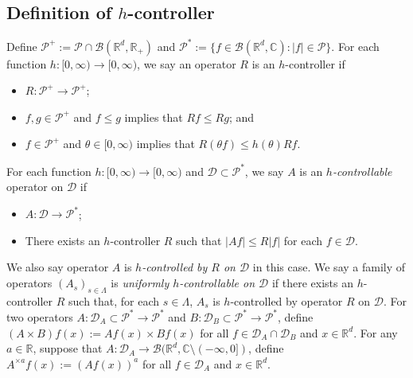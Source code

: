 \documentclass[12pt,a4paper]{amsart}
\theoremstyle{plain}
\theoremstyle{definition}
\numberwithin{equation}{section}
\begin{document}
\subsection{Definition of $h$-controller}
    Define $\mathcal P^+:= \mathcal P \cap \mathcal B(\mathbb R^d, \mathbb R_+)$ and $\mathcal P^*:= \{f\in \mathcal B(\mathbb R^d, \mathbb C): |f|\in \mathcal P\}$.
    For each function $h: [0,\infty) \to [0,\infty)$, we say an operator $R$ is an $h$-controller if
\begin{itemize}
\item
    $R: \mathcal P^+ \to \mathcal P^+$;
\item
    $f, g\in \mathcal P^+$ and $f\leq g$ implies that $Rf \leq Rg$; and
\item
    $f \in \mathcal P^+$ and $\theta \in [0,\infty)$ implies that $ R (\theta f)\leq h(\theta) Rf$.
\end{itemize}
    For each function $h: [0,\infty) \to [0,\infty)$ and $\mathcal D \subset \mathcal P^*$, we say $A$ is an \emph{$h$-controllable} operator on $\mathcal D$ if
\begin{itemize}
\item
    $A : \mathcal D \to \mathcal P^*$;
\item
    There exists an $h$-controller $R$ such that $|Af| \leq R|f|$ for each $f\in \mathcal D$.
\end{itemize}
    We also say operator $A$ is \emph{$h$-controlled by $R$ on $\mathcal D$} in this case.
    We say a family of operators $(A_s)_{s\in \Lambda}$ is \emph{uniformly $h$-controllable on $\mathcal D$} if there exists an $h$-controller $R$ such that, for each $s\in \Lambda$, $A_s$ is $h$-controlled by operator $R$ on $\mathcal D$.
    For two operators $A: \mathcal D_A \subset \mathcal P^*\to \mathcal P^*$ and $B: \mathcal D_B \subset \mathcal P^*\to \mathcal P^*$, define $(A \times B)f (x):= Af(x) \times Bf(x)$ for all $f\in \mathcal D_A \cap \mathcal D_B$ and $x\in \mathbb{R}^d$.
    For any $a \in \mathbb R$, suppose that $A :\mathcal D_A \to \mathcal B(\mathbb R^d, \mathbb C\setminus (-\infty, 0])$, define $A^{\times a}f(x):= (Af(x))^a$ for all $f\in \mathcal D_A$ and $x\in \mathbb R^d$.
\end{document}

